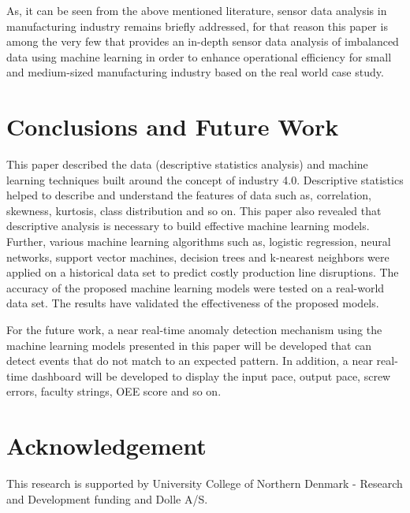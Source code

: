 \documentclass[runningheads]{llncs}
\begin{document}
As, it can be seen from the above mentioned literature, sensor data analysis in manufacturing industry remains briefly addressed, for that reason this paper is among the very few that provides an in-depth sensor data analysis of imbalanced data using machine learning in order to enhance operational efficiency for small and medium-sized manufacturing industry based on the real world case study.

\section{Conclusions and Future Work}
\label{sec:conclusionandfuturework}
This paper described the data (descriptive statistics analysis) and machine learning techniques built around the concept of industry 4.0. Descriptive statistics helped to describe and understand the features of data such as, correlation, skewness, kurtosis, class distribution and so on. This paper also revealed that descriptive analysis is necessary to build effective machine learning models. Further, various machine learning algorithms such as, logistic regression, neural networks, support vector machines, decision trees and k-nearest neighbors were applied on a historical data set to predict costly production line disruptions. The accuracy of the proposed machine learning models were tested on a real-world data set. The results have validated the effectiveness of the proposed models.

For the future work, a near real-time anomaly detection mechanism using the machine learning models presented in this paper will be developed that can detect events that do not match to an expected pattern. In addition, a near real-time dashboard will be developed to display the input pace, output pace, screw errors, faculty strings, OEE score and so on.



\section{Acknowledgement}
This  research is supported  by University College of Northern Denmark - Research and Development funding and Dolle A/S.
\end{document}
